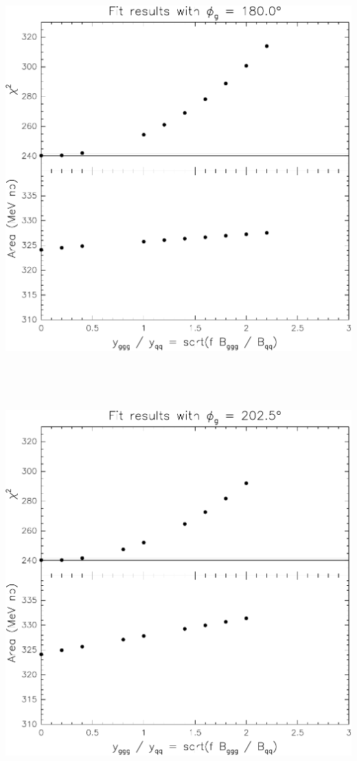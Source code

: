 \documentclass[12pt]{article}
\begin{document}
\vfill

\mbox{ }

\pagebreak

\mbox{ }

\vfill

\includegraphics[width=\linewidth]{interference-i}

\vfill

\mbox{ }

\pagebreak

\mbox{ }

\vfill

\includegraphics[width=\linewidth]{interference-j}
\end{document}
